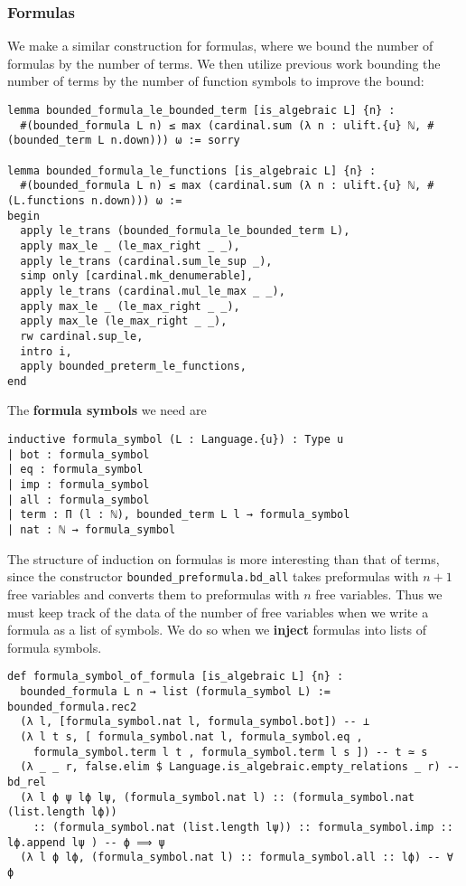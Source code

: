 \subsubsection{Formulas}

We make a similar construction for formulas,
where we bound the number of formulas by the number of terms.
We then utilize previous work bounding the number of terms by the
number of function symbols to improve the bound:
\begin{lstlisting}
lemma bounded_formula_le_bounded_term [is_algebraic L] {n} :
  #(bounded_formula L n) ≤ max (cardinal.sum (λ n : ulift.{u} ℕ, #(bounded_term L n.down))) ω := sorry

lemma bounded_formula_le_functions [is_algebraic L] {n} :
  #(bounded_formula L n) ≤ max (cardinal.sum (λ n : ulift.{u} ℕ, #(L.functions n.down))) ω :=
begin
  apply le_trans (bounded_formula_le_bounded_term L),
  apply max_le _ (le_max_right _ _),
  apply le_trans (cardinal.sum_le_sup _),
  simp only [cardinal.mk_denumerable],
  apply le_trans (cardinal.mul_le_max _ _),
  apply max_le _ (le_max_right _ _),
  apply max_le (le_max_right _ _),
  rw cardinal.sup_le,
  intro i,
  apply bounded_preterm_le_functions,
end \end{lstlisting}

The \textbf{formula symbols} we need are

\begin{lstlisting}
inductive formula_symbol (L : Language.{u}) : Type u
| bot : formula_symbol
| eq : formula_symbol
| imp : formula_symbol
| all : formula_symbol
| term : Π (l : ℕ), bounded_term L l → formula_symbol
| nat : ℕ → formula_symbol \end{lstlisting}

The structure of induction on formulas is more interesting than
that of terms, since the constructor \texttt{bounded\_preformula.bd\_all} takes preformulas with $n + 1$ free variables and converts them to
preformulas with $n$ free variables.
Thus we must keep track of the data of the number of free variables
when we write a formula as a list of symbols.
We do so when we \textbf{inject} formulas into lists of formula symbols.

\begin{lstlisting}
def formula_symbol_of_formula [is_algebraic L] {n} :
  bounded_formula L n → list (formula_symbol L) :=
bounded_formula.rec2
  (λ l, [formula_symbol.nat l, formula_symbol.bot]) -- ⊥
  (λ l t s, [ formula_symbol.nat l, formula_symbol.eq ,
    formula_symbol.term l t , formula_symbol.term l s ]) -- t ≃ s
  (λ _ _ r, false.elim $ Language.is_algebraic.empty_relations _ r) -- bd_rel
  (λ l ϕ ψ lϕ lψ, (formula_symbol.nat l) :: (formula_symbol.nat (list.length lϕ))
    :: (formula_symbol.nat (list.length lψ)) :: formula_symbol.imp :: lϕ.append lψ ) -- ϕ ⟹ ψ
  (λ l ϕ lϕ, (formula_symbol.nat l) :: formula_symbol.all :: lϕ) -- ∀ ϕ \end{lstlisting}


